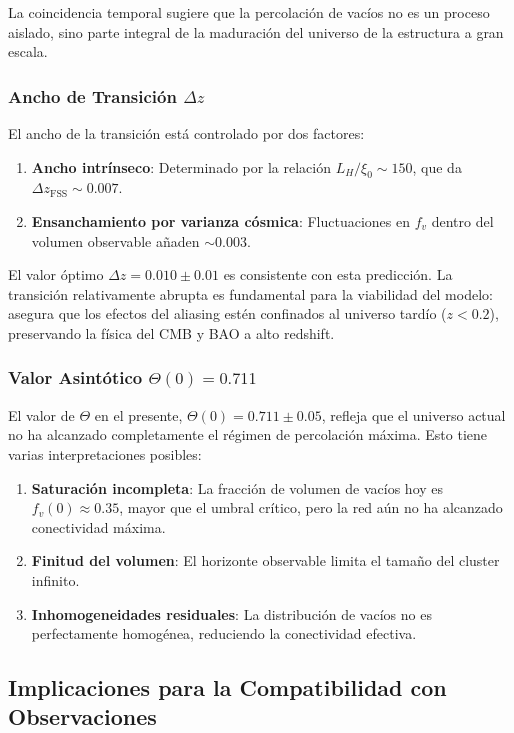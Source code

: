 \documentclass[12pt, a4paper]{article}
\theoremstyle{plain}
\theoremstyle{definition}
\begin{document}
La coincidencia temporal sugiere que la percolación de vacíos no es un proceso aislado, sino parte integral de la maduración del universo de la estructura a gran escala.

\subsubsection{Ancho de Transición $\Delta z$}

El ancho de la transición está controlado por dos factores:
\begin{enumerate}
    \item \textbf{Ancho intrínseco}: Determinado por la relación $L_H/\xi_0 \sim 150$, que da $\Delta z_{\text{FSS}} \sim 0.007$.
    \item \textbf{Ensanchamiento por varianza cósmica}: Fluctuaciones en $f_v$ dentro del volumen observable añaden $\sim 0.003$.
\end{enumerate}

El valor óptimo $\Delta z = 0.010 \pm 0.01$ es consistente con esta predicción. La transición relativamente abrupta es fundamental para la viabilidad del modelo: asegura que los efectos del aliasing estén confinados al universo tardío ($z < 0.2$), preservando la física del CMB y BAO a alto redshift.

\subsubsection{Valor Asintótico $\Theta(0) = 0.711$}

El valor de $\Theta$ en el presente, $\Theta(0) = 0.711 \pm 0.05$, refleja que el universo actual no ha alcanzado completamente el régimen de percolación máxima. Esto tiene varias interpretaciones posibles:

\begin{enumerate}
    \item \textbf{Saturación incompleta}: La fracción de volumen de vacíos hoy es $f_v(0) \approx 0.35$, mayor que el umbral crítico, pero la red aún no ha alcanzado conectividad máxima.
    \item \textbf{Finitud del volumen}: El horizonte observable limita el tamaño del cluster infinito.
    \item \textbf{Inhomogeneidades residuales}: La distribución de vacíos no es perfectamente homogénea, reduciendo la conectividad efectiva.
\end{enumerate}

\subsection{Implicaciones para la Compatibilidad con Observaciones}
\end{document}
